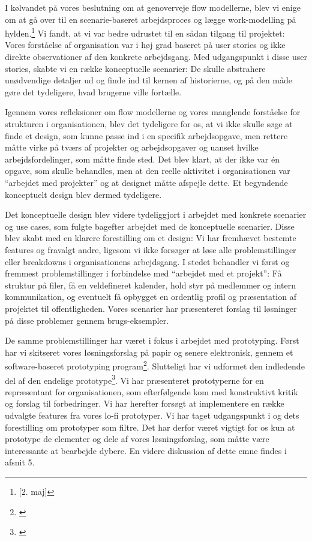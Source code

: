 I kølvandet på vores beslutning om at genoverveje flow modellerne, blev vi enige om at gå over til en scenarie-baseret arbejdsproces og lægge work-modelling på hylden.\footnote{\citep{Dagbog}[2. maj]} Vi fandt, at vi var bedre udrustet til en sådan tilgang til projektet: Vores forståelse af organisation var i høj grad baseret på user stories og ikke direkte observationer af den konkrete arbejdsgang. Med udgangspunkt i disse user stories, skabte vi en række konceptuelle scenarier: De skulle abstrahere unødvendige detaljer ud og finde ind til kernen af historierne, og på den måde gøre det tydeligere, hvad brugerne ville fortælle. 

Igennem vores refleksioner om flow modellerne og vores manglende forståelse for strukturen i organisationen, blev det tydeligere for os, at vi ikke skulle søge at finde et design, som kunne passe ind i en specifik arbejdsopgave, men rettere måtte virke på tværs af projekter og arbejdsopgaver og uanset hvilke arbejdsfordelinger, som måtte finde sted. Det blev klart, at der ikke var én opgave, som skulle behandles, men at den reelle aktivitet i organisationen var “arbejdet med projekter” og at designet måtte afspejle dette. Et begyndende konceptuelt design blev dermed tydeligere.

Det konceptuelle design blev videre tydeliggjort i arbejdet med konkrete scenarier og use cases, som fulgte bagefter arbejdet med de konceptuelle scenarier. Disse blev skabt med en klarere forestilling om et design: Vi har fremhævet bestemte features og fravalgt andre, ligesom vi ikke forsøger at løse alle problemstillinger eller breakdowns i organisationens arbejdsgang. I stedet behandler vi først og fremmest problemstillinger i forbindelse med “arbejdet med et projekt”: Få struktur på filer, få en veldefineret kalender, hold styr på medlemmer og intern kommunikation, og eventuelt få opbygget en ordentlig profil og præsentation af projektet til offentligheden. Vores scenarier har præsenteret forslag til løsninger på disse problemer gennem brugs-eksempler.

De samme problemstillinger har været i fokus i arbejdet med prototyping. Først har vi skitseret vores løsningsforslag på papir og senere elektronisk, gennem et software-baseret prototyping program\footnote{\citep{Proto1}}. Slutteligt har vi udformet den indledende del af den endelige prototype\footnote{\citep{Proto2}}. Vi har præsenteret prototyperne for en repræsentant for organisationen, som efterfølgende kom med konstruktivt kritik og forslag til forbedringer. Vi har herefter forsøgt at implementere en række udvalgte features fra vores lo-fi prototyper. Vi har taget udgangspunkt i \citep{Lim} og dets forestilling om prototyper som filtre. Det har derfor været vigtigt for os kun at prototype de elementer og dele af vores løsningsforslag, som måtte være interessante at bearbejde dybere. En videre diskussion af dette emne findes i afsnit 5.

